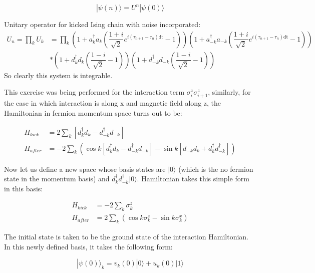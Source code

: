 \documentclass[11pt,a4paper]{article}
\begin{document}
		 \begin{equation}
		 |\psi(n)\rangle = U^n |\psi(0)\rangle
		 \end{equation}
		
		
		Unitary operator for kicked Ising chain with noise incorporated:
		\begin{align}\label{noisyunitary}
	U_{n} = \prod_{k}U_{k} &= \prod_{k}	(1 + a_{k}^\dagger a_{k}(\dfrac{1+i}{\sqrt{2}}e^{i(\tau_{n+1}-\tau_{n})\text{dt}}-1))(1 + a_{-k}^\dagger a_{-k}(\dfrac{1+i}{\sqrt{2}}e^{i(\tau_{n+1}-\tau_{n})\text{dt}}-1))\\&*(1 + d_{k}^\dagger d_{k}(\dfrac{1-i}{\sqrt{2}}-1))(1 + d_{-k}^\dagger d_{-k}(\dfrac{1-i}{\sqrt{2}}-1))
		\end{align}
		So clearly this system is integrable. 

	This exercise was being performed for the interaction term $\sigma^z_{i}\sigma^z_{i+1}$, similarly, for the case in which interaction is along x and magnetic field along z, the Hamiltonian in fermion momentum space turns out to be:
	
	\begin{align}
			H_{kick} &= 2 \sum_{k}  [d_{k}^\dagger d_{k} - d_{-k}^\dagger d_{-k}]\\
			H_{after} &= -2\sum_{k}(  \cos k [d_{k}^\dagger d_{k} - d_{-k}^\dagger d_{-k}] -  \sin k [d_{-k}d_{k} + d_{k}^\dagger d_{-k}^\dagger])
			\end{align}		
			
			Now let us define a new space whose basis states are $ |0\rangle $ (which is the no fermion state in the momentum basis) and $ d_{k}^\dagger d_{-k}^\dagger |0\rangle $. Hamiltonian takes this simple form in this basis:
			
			\begin{align}
			H_{kick} &= -2 \sum_{k}  \sigma_{k}^z\\
			H_{after} &= 2\sum_{k} (\cos k \sigma_{k}^z - \sin k \sigma_{k}^x )
			\end{align}	
			
			
	The initial state is taken to be the ground state of the interaction Hamiltonian. In this newly defined basis, it takes the following form:
		
		\begin{equation}\label{key}
		 |\psi(0)\rangle_{k} = v_{k}(0) |0\rangle + u_{k}(0) |1\rangle
		\end{equation}
		
\end{document}
